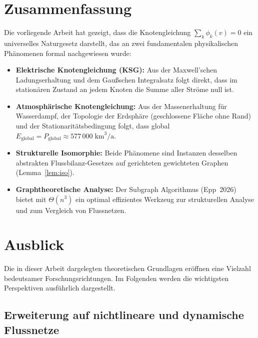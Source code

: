 ﻿\documentclass[a4paper,12pt]{article}
\theoremstyle{definition}
\begin{document}
\section{Zusammenfassung}

Die vorliegende Arbeit hat gezeigt, dass die Knotengleichung
$\sum_k \phi_k(v) = 0$ ein universelles Naturgesetz darstellt, das
an zwei fundamentalen physikalischen Phänomenen formal nachgewiesen wurde:

\begin{itemize}
  \item \textbf{Elektrische Knotengleichung (KSG):} Aus der
    Maxwell'schen Ladungserhaltung und dem Gaußschen Integralsatz folgt
    direkt, dass im stationären Zustand an jedem Knoten die Summe aller
    Ströme null ist.
  \item \textbf{Atmosphärische Knotengleichung:} Aus der Massenerhaltung
    für Wasserdampf, der Topo\-logie der Erdsphäre (geschlossene Fläche ohne
    Rand) und der Stationaritätsbedingung folgt, dass global
    $E_\mathrm{global} = P_\mathrm{global} \approx 577\,000\;\text{km}^3/\text{a}$.
  \item \textbf{Strukturelle Isomorphie:} Beide Phänomene sind Instanzen
    desselben abstrakten Flussbilanz-Gesetzes auf gerichteten gewichteten
    Graphen (Lemma~\ref{lem:iso}).
  \item \textbf{Graphtheoretische Analyse:} Der Subgraph Algorithmus
    (Epp~2026) bietet mit $\Theta(n^3)$ ein optimal effizientes Werkzeug
    zur strukturellen Analyse und zum Vergleich von Flussnetzen.
\end{itemize}

\section{Ausblick}

Die in dieser Arbeit dargelegten theoretischen Grundlagen eröffnen eine
Vielzahl bedeutsamer Forschungsrichtungen. Im Folgenden werden die
wichtigsten Perspektiven ausführlich dargestellt.

\subsection{Erweiterung auf nichtlineare und dynamische Flussnetze}
\end{document}
